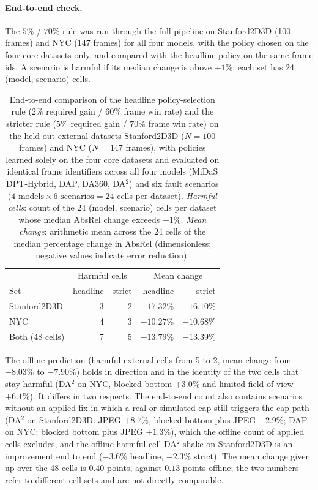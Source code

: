 \documentclass{article}
\newcommand{\absrel}{AbsRel}
\begin{document}
\paragraph{End-to-end check.} The $5\%$ / $70\%$ rule was run through the full pipeline on Stanford2D3D (100 frames) and NYC (147 frames) for all four models, with the policy chosen on the four core datasets only, and compared with the headline policy on the same frame ids. A scenario is harmful if its median change is above $+1\%$; each set has 24 (model, scenario) cells.

\begin{table}[ht]\centering\small
\caption{End-to-end comparison of the headline policy-selection rule ($2\%$ required gain / $60\%$ frame win rate) and the stricter rule ($5\%$ required gain / $70\%$ frame win rate) on the held-out external datasets Stanford2D3D ($N=100$ frames) and NYC ($N=147$ frames), with policies learned solely on the four core datasets and evaluated on identical frame identifiers across all four models (MiDaS DPT-Hybrid, DAP, DA360, DA$^2$) and six fault scenarios ($4\text{ models}\times6\text{ scenarios}=24$ cells per dataset). \emph{Harmful cells}: count of the 24 (model, scenario) cells per dataset whose median \absrel{} change exceeds $+1\%$. \emph{Mean change}: arithmetic mean across the 24 cells of the median percentage change in \absrel{} (dimensionless; negative values indicate error reduction).}
\begin{tabular}{lrrrr}\toprule
 & \multicolumn{2}{c}{Harmful cells} & \multicolumn{2}{c}{Mean change}\\
Set & headline & strict & headline & strict\\\midrule
Stanford2D3D & 3 & 2 & $-17.32\%$ & $-16.10\%$\\
NYC & 4 & 3 & $-10.27\%$ & $-10.68\%$\\
Both (48 cells) & 7 & 5 & $-13.79\%$ & $-13.39\%$\\
\bottomrule\end{tabular}
\end{table}
The offline prediction (harmful external cells from 5 to 2, mean change from $-8.03\%$ to $-7.90\%$) holds in direction and in the identity of the two cells that stay harmful (DA$^2$ on NYC, blocked bottom $+3.0\%$ and limited field of view $+6.1\%$). It differs in two respects. The end-to-end count also contains scenarios without an applied fix in which a real or simulated cap still triggers the cap path (DA$^2$ on Stanford2D3D: JPEG $+8.7\%$, blocked bottom plus JPEG $+2.9\%$; DAP on NYC: blocked bottom plus JPEG $+1.3\%$), which the offline count of applied cells excludes, and the offline harmful cell DA$^2$ shake on Stanford2D3D is an improvement end to end ($-3.6\%$ headline, $-2.3\%$ strict). The mean change given up over the 48 cells is $0.40$ points, against $0.13$ points offline; the two numbers refer to different cell sets and are not directly comparable.
\end{document}
